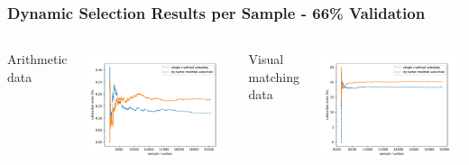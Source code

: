 \documentclass{beamer}
\begin{document}
\begin{frame}
\frametitle{Dynamic Selection Results per Sample - 66\% Validation}
\begin{columns}[c]
\begin{center}
Arithmetic data
\end{center}
\includegraphics[width=\textwidth]{switching/nata/0.66/nata66}

\begin{center}
Visual matching data
\end{center}
\includegraphics[width=\textwidth]{switching/vismatch/0.66/vismatch66}


\end{columns}
\end{frame}
\end{document}
